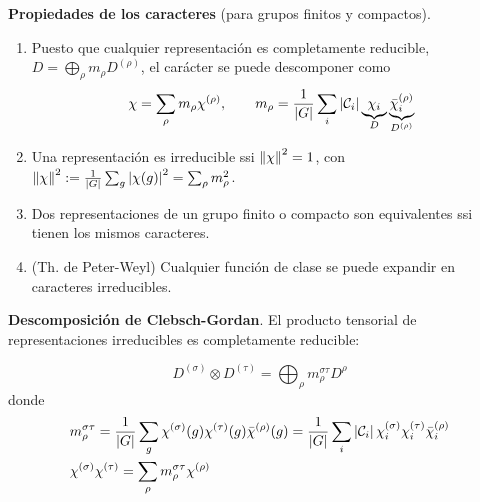 \begin{flushleft}
\textbf{Propiedades de los caracteres} (para grupos finitos y compactos).
\end{flushleft}
\begin{enumerate}[label=\roman*)]
\item Puesto que cualquier representación es completamente reducible, $D=\bigoplus_\rho m_\rho D^{(\rho)}$, el carácter se puede descomponer como
\begin{equation}
\chi=\sum_\rho m_\rho \chi^{(\rho)},\qquad m_\rho=\frac{1}{\left\lvert G\right\rvert}
\sum_i \left\lvert\mathcal{C}_i\right\rvert\underbrace{\chi_i}_D \underbrace{\bar{\chi}_i^{(\rho)}}_{D^{(\rho)}}
\end{equation}
\item Una representación es irreducible ssi $\left\lVert\chi\right\rVert^2=1$, con $\left\lVert\chi\right\rVert^2:=\frac{1}{\left\lvert G\right\rvert}\sum_g\left\lvert\chi(g)\right\rvert^2=\sum_\rho m_\rho^2$.
\item Dos representaciones de un grupo finito o compacto son equivalentes ssi tienen los mismos caracteres.
\item (Th. de Peter-Weyl) Cualquier función de clase se puede expandir en caracteres irreducibles.
\end{enumerate}

\begin{flushleft}
\textbf{Descomposición de Clebsch-Gordan}. El producto tensorial de representaciones irreducibles es completamente reducible:
\end{flushleft}
\begin{equation}
D^{(\sigma)}\otimes D^{(\tau)}=\bigoplus_\rho m_\rho^{\sigma\tau} D^{\rho}
\end{equation}
donde
\begin{subequations}
\begin{flalign}
&m_\rho^{\sigma\tau}=\frac{1}{\abs{G}}\sum_g\chi^{(\sigma)}(g)\chi^{(\tau)}(g)\bar{\chi}^{(\rho)}(g)=\frac{1}{|G|} \sum_{i}\left|\mathcal{C}_{i}\right| \chi_{i}^{(\sigma)} \chi_{i}^{(\tau)} \bar{\chi}_{i}^{(\rho)}\\%
&\chi^{(\sigma)} \chi^{(\tau)}=\sum_{\rho} m_{\rho}^{\sigma \tau} \chi^{(\rho)}
\end{flalign}
\end{subequations}

